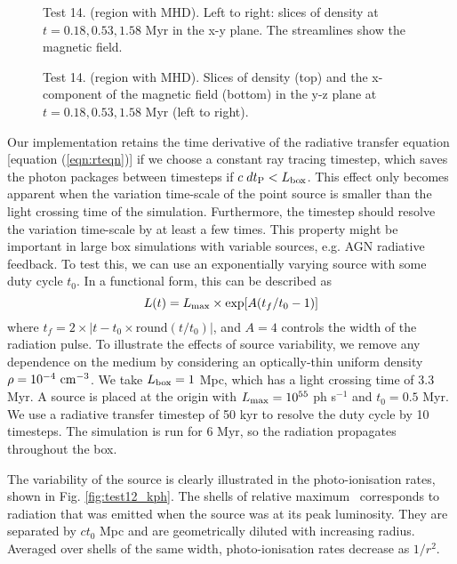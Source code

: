 \documentclass[useAMS,usenatbib]{mn2e}
\begin{document}
\begin{figure*}
  \caption{\label{fig:test14_1} Test 14. (\hii region with MHD).
    Left to right: slices of density at $t = 0.18, 0.53, 1.58$ Myr in
    the x-y plane.  The streamlines show the magnetic field.}
\end{figure*}

\begin{figure*}
  \caption{\label{fig:test14_2} Test 14. (\hii region with
    MHD). Slices of density (top) and the x-component of the magnetic
    field (bottom) in the y-z plane at $t = 0.18, 0.53, 1.58$ Myr
    (left to right).}
\end{figure*}

Our implementation retains the time derivative of the radiative
transfer equation [equation (\ref{eqn:rteqn})] if we choose a constant
ray tracing timestep, which saves the photon packages between
timesteps if $c\;dt_{\rm P} < L_{\rm box}$.  This effect only becomes
apparent when the variation time-scale of the point source is smaller
than the light crossing time of the simulation.  Furthermore, the
timestep should resolve the variation time-scale by at least a few
times.  This property might be important in large box simulations with
variable sources, e.g. AGN radiative feedback.  To test this, we can
use an exponentially varying source with some duty cycle $t_0$.  In a
functional form, this can be described as
%
\begin{equation}
  \label{eqn:test12}
  L(t) = L_{\rm max} \times \exp[A(t_f/t_0 - 1)]
\end{equation}
%
where $t_f = 2 \times |t - t_0 \times \mathrm{round}(t/t_0)|$, and
$A=4$ controls the width of the radiation pulse.  To illustrate the
effects of source variability, we remove any dependence on the medium
by considering an optically-thin uniform density $\rho =
10^{-4}~\cubecm$.  We take $L_{\rm box} = 1$ Mpc, which has a light
crossing time of 3.3 Myr.  A source is placed at the origin with
$L_{\rm max} = 10^{55}$ ph s$^{-1}$ and $t_0 = 0.5$ Myr.  We use a
radiative transfer timestep of 50 kyr to resolve the duty cycle by 10
timesteps.  The simulation is run for 6 Myr, so the radiation
propagates throughout the box.

The variability of the source is clearly illustrated in the
photo-ionisation rates, shown in Fig. \ref{fig:test12_kph}.  The
shells of relative maximum \kph~corresponds to radiation that was
emitted when the source was at its peak luminosity.  They are
separated by $ct_0$ Mpc and are geometrically diluted with increasing
radius.  Averaged over shells of the same width, photo-ionisation
rates decrease as $1/r^2$.
\end{document}
